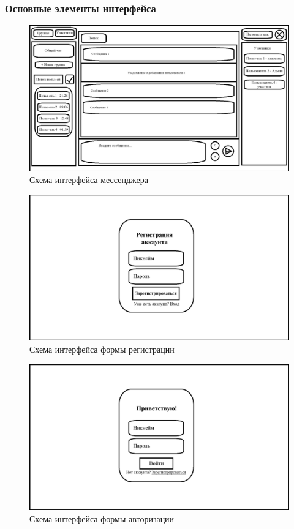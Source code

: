 \subsubsection{Основные элементы интерфейса}

\begin{figure}[ht]
	\centering
	\includegraphics[width=0.8\linewidth]{"images/UI макет"}
	\caption{Схема интерфейса мессенджера}
	\label{fig:ui-main}
\end{figure}

\begin{figure}[ht]
	\centering
	\includegraphics[width=0.8\linewidth]{"images/UI макет регистрации"}
	\caption{Схема интерфейса формы регистрации}
	\label{fig:ui-reg}
\end{figure}

\begin{figure}[ht]
	\centering
	\includegraphics[width=0.8\linewidth]{"images/UI макет авторизации"}
	\caption{Схема интерфейса формы авторизации}
	\label{fig:ui-auth}
\end{figure}

